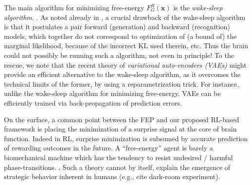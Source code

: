 \documentclass[10pt,letterpaper]{article}
\def\x{\mathbf{x}}
\begin{document}
The main algorithm for minimizing free-energy $F_G^R(\x)$ is the \textit{wake-sleep algorithm}.
\citep{dayan1995helmholtz}. As noted already in \citep{dayan1995helmholtz},
a crucial drawback of the wake-sleep algorithm is that it postulates a pair forward (generation) and backward (recognition) models,
which together do not correspond to optimization of (a bound of) the marginal likelihood, because of the incorrect KL used therein, etc.
Thus the brain could not possibly be running such a algorithm, not even in principle! To the rescue, we note that the recent theory of
\textit{variational auto-encoders (VAEs)} \citep{kingma2013auto} might provide an efficient alternative to the wake-sleep algorithm,
as it overcomes the technical limits of the former, by using a reparametrization trick. For instance, unlike the wake-sleep algorithm
for minimizing free-energy, VAEs can be efficiently trained via back-propagation of prediction errors.

On the surface, a common point between the FEP and our proposed RL-based framework
  is placing the minimization of a surprise signal at the core of brain function.
  Indeed in RL, surprise minimization is subsumed  by accurate prediction of
  rewarding outcomes in the future. A ``free-energy'' agent is barely a biomechanical machine which has the tendency to resist undesired / harmful phase-transitions.
  \citep{friston2010free,fristonAIorRL,ortega2013thermodynamics}. Such a theory cannot by itself,
  explain the emergence of strategic behavior inherent in humans (e.g.,  cite dark-room experiment).

\end{document}
